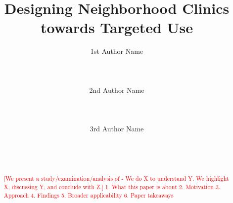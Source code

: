 \documentclass{sigchi}
\begin{document}
\title{Designing Neighborhood Clinics towards Targeted Use}

\author{
  \alignauthor 1st Author Name\\
    \\
    \\
    \\
  \alignauthor 2nd Author Name\\
    \\
    \\
    \\
  \alignauthor 3rd Author Name\\
    \\
    \\
    \\
}

\maketitle

\begin{abstract}
\begin{comment}
You should write an abstract early on, knowing fully well that you will (and should) iterate through it at least 3-4 times. It is also the thing you should edit again just before you submit.

Example:
"We present the design, deployment, and mixed-methods evaluation of an interactive education software developed to circumvent taboos in teaching youth in India about HIV prevention. While extremely important, providing complete and accurate HIV education in India has historically been difficult because of cultural taboos around the virus' method of transmission. To address this gap, we used an iterative design process to develop a culturally appropriate educational software that leverages the unique affordances of technology and key theories from the learning sciences and communication. We demonstrate that this software leaves students significantly more knowledgeable about HIV transmission and prevention and with reduced stigma toward individuals infected with HIV. Validating its effectiveness in circumventing taboos, the software has since been adopted by numerous local governments in India where other HIV education materials had been banned, and students report extreme comfort learning from it. The methodology presented here has broader implications for the development and implementation of technology designed to educate on sensitive topics in health and other areas."
\end{comment}
\textcolor{red}{[We present a study/examination/analysis of - We do X to understand Y. We highlight X, discussing Y, and conclude with Z.]
1. What this paper is about
2. Motivation
3. Approach
4. Findings
5. Broader applicability
6. Paper takeaways
}
\end{abstract}
\end{document}
